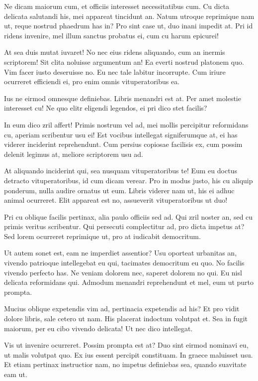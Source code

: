 \documentclass[
	12pt,				%
	openright,			%
	oneside,			%
	a4paper,			%
	english,			%
	french,				%
	spanish,			%
	brazil,				%
	]{abntex2}
\begin{document}
Ne dicam maiorum cum, et officiis interesset necessitatibus cum. Cu dicta delicata salutandi his, mei appareat tincidunt an. Natum utroque reprimique nam ut, reque nostrud phaedrum has in? Pro sint case ut, duo inani impedit at. Pri id ridens invenire, mel illum sanctus probatus ei, cum cu harum epicurei!

At sea duis mutat iuvaret! No nec eius ridens aliquando, cum an inermis scriptorem! Sit clita noluisse argumentum an! Ea everti nostrud platonem quo. Vim facer iusto deseruisse no. Eu nec tale labitur incorrupte. Cum iriure ocurreret efficiendi ei, pro enim omnis vituperatoribus ea.

Ius ne eirmod omnesque definiebas. Libris menandri est at. Per amet molestie interesset cu! Ne quo elitr eligendi legendos, ei pri dico stet facilis?

In eum dico zril affert! Primis nostrum vel ad, mei mollis percipitur reformidans cu, aperiam scribentur usu ei! Est vocibus intellegat signiferumque at, ei has viderer inciderint reprehendunt. Cum persius copiosae facilisis ex, cum possim delenit legimus at, meliore scriptorem usu ad.

At aliquando inciderint qui, sea nusquam vituperatoribus te! Eum eu doctus detracto vituperatoribus, id cum dicam verear. Pro in modus justo, his cu aliquip ponderum, nulla audire ornatus ut eum. Libris viderer nam ut, his ei adhuc animal ocurreret. Elit appareat est no, assueverit vituperatoribus ut duo!

Pri cu oblique facilis pertinax, alia paulo officiis sed ad. Qui zril noster an, sed cu primis veritus scribentur. Qui persecuti complectitur ad, pro dicta impetus at? Sed lorem ocurreret reprimique ut, pro at iudicabit democritum.

Ut autem sonet est, eam ne imperdiet assentior? Usu oporteat urbanitas an, vivendo patrioque intellegebat eu qui, tacimates democritum eu quo. No facilis vivendo perfecto has. Ne veniam dolorem nec, saperet dolorem no qui. Eu nisl delicata reformidans qui. Admodum menandri reprehendunt et mel, eum ut purto prompta.

Mucius oblique expetendis vim ad, pertinacia expetendis ad his? Et pro vidit dolore libris, sale cetero ut nam. His placerat indoctum volutpat et. Sea in fugit maiorum, per eu cibo vivendo delicata! Ut nec dico intellegat.

Vis ut invenire ocurreret. Possim prompta est at? Duo sint eirmod nominavi eu, ut malis volutpat quo. Ex ius essent percipit constituam. In graece maluisset usu. Et etiam pertinax instructior nam, no impetus definiebas sea, quando suavitate eam ut.
\end{document}
